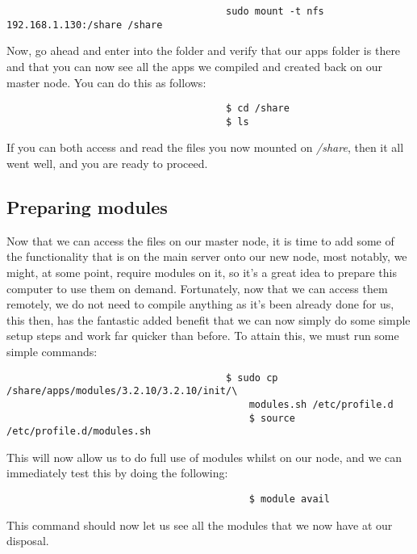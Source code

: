 \documentclass[]{article}
\begin{document}
                                      \begin{lstlisting}
                                      sudo mount -t nfs 192.168.1.130:/share /share
                                      \end{lstlisting}
                                      Now, go ahead and enter into the folder and verify that our apps folder is there and that you can now see all the apps we compiled and
                                      created back on our master node. You can do this as follows:
                                      \begin{lstlisting}
                                      $ cd /share
                                      $ ls
                                      \end{lstlisting}
                                      If you can both access and read the files you now mounted on \textit{/share}, then it all went well, and you are ready to proceed.

                                      \subsection{Preparing modules}
                                      Now that we can access the files on our master node, it is time to add some of the functionality that is on the main server onto our 
                                      new node, most notably, we might, at some point, require modules on it, so it's a great idea to prepare this computer to use them on 
                                      demand. Fortunately, now that we can access them remotely, we do not need to compile anything as it's been already done for us, this
                                      then, has the fantastic added benefit that we can now simply do some simple setup steps and work far quicker than before. To attain 
                                      this, we must run some simple commands:
                                      \begin{lstlisting}
                                      $ sudo cp /share/apps/modules/3.2.10/3.2.10/init/\
                                          modules.sh /etc/profile.d
                                          $ source /etc/profile.d/modules.sh
                                          \end{lstlisting}
                                          This will now allow us to do full use of modules whilst on our node, and we can immediately test this by doing the following:
                                          \begin{lstlisting}
                                          $ module avail
                                          \end{lstlisting}
                                          This command should now let us see all the modules that we now have at our disposal.
\end{document}
